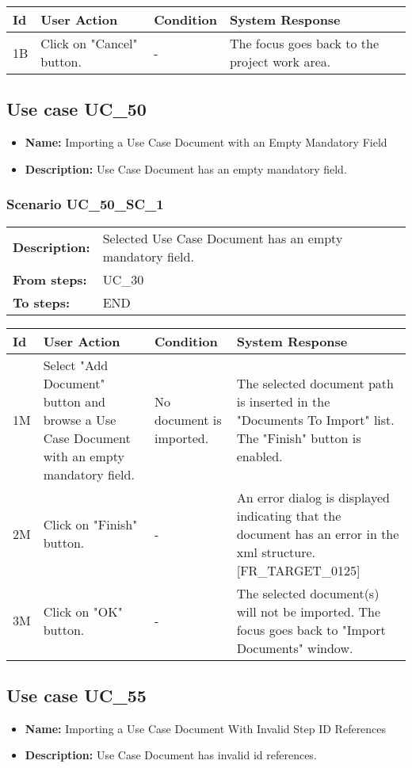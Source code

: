 \documentclass[a4paper,11pt]{article}
\newcommand{\bl}{\\ \hline}
\begin{document}
\begin{tabular}{|p{0.8in}|p{1.6in}|p{1.6in}|p{1.6in}|}
\hline
Id & User Action & Condition & System Response  \bl 
1B & Click on "Cancel" button. & - & The focus goes back to the project work area. \bl 
\end{tabular}
\subsection*{Use case UC_50}
\begin{itemize}
\item {\bf Name: }Importing a Use Case Document with an Empty Mandatory Field
\item {\bf Description: }Use Case Document has an empty mandatory field.
\end{itemize}
\subsubsection*{Scenario UC_50_SC_1}
\begin{tabular}{p{1in}p{4in}}
{\bf Description:} & Selected Use Case Document has an empty mandatory field. \\
{\bf From steps:} & UC_30#2M \\
{\bf To steps:} & END \\
\end{tabular}
 
\begin{tabular}{|p{0.8in}|p{1.6in}|p{1.6in}|p{1.6in}|}
\hline
Id & User Action & Condition & System Response  \bl 
1M & Select "Add Document" button and browse a Use Case Document with an empty mandatory field. & No document is imported. & The selected document path is inserted in the "Documents To Import" list. The "Finish" button is enabled. \bl 
2M & Click on "Finish" button. & - & An error dialog is displayed indicating that the document has an error in the xml structure. [FR_TARGET_0125] \bl 
3M & Click on "OK" button. & - & The selected document(s) will not be imported. The focus goes back to "Import Documents" window. \bl 
\end{tabular}
\subsection*{Use case UC_55}
\begin{itemize}
\item {\bf Name: }Importing a Use Case Document With Invalid Step ID References
\item {\bf Description: }Use Case Document has invalid id references.
\end{itemize}
\end{document}
